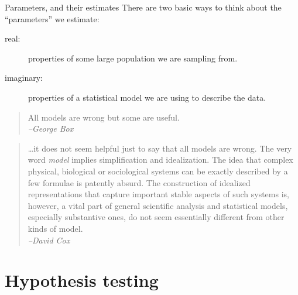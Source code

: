 \begin{frame}{Parameters, and their estimates}
    There are two basic ways to think about the ``parameters'' we estimate:
    \begin{description}
        \item[real:] properties of some large population we are sampling from.
            \pause
        \item[imaginary:] properties of a statistical model we are using to describe the data.
    \end{description}
    \vspace{2em}
    \pause

    \begin{quote}
            All models are wrong but some are useful.\\
            \hfill \textit{--George Box}
    \end{quote}
    \pause


    \begin{quote}
        \small
               \ldots it does not seem helpful just to say that all models are wrong. 
               The very word \emph{model} implies simplification and idealization. 
               The idea that complex physical, biological or sociological systems 
               can be exactly described by a few formulae is patently absurd. 
               The construction of idealized representations that capture important stable aspects of such systems is, 
               however, a vital part of general scientific analysis and statistical models, 
               especially substantive ones, do not seem essentially different from other kinds of model. 
               \\
               \hfill \textit{--David Cox}
    \end{quote}
\end{frame}

\section{Hypothesis testing}

